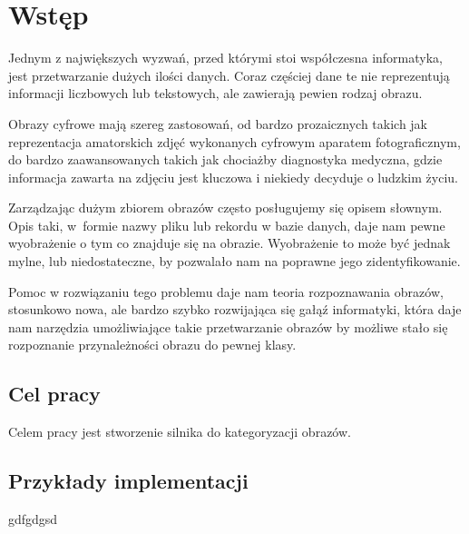 \chapter*{Wstęp}

Jednym z największych wyzwań, przed którymi stoi współczesna informatyka, jest przetwarzanie dużych ilości danych. Coraz częściej dane te nie reprezentują informacji liczbowych lub tekstowych, ale zawierają pewien rodzaj obrazu. 

Obrazy cyfrowe mają szereg zastosowań, od bardzo prozaicznych takich jak reprezentacja amatorskich zdjęć wykonanych cyfrowym aparatem fotograficznym, do bardzo zaawansowanych takich jak chociażby diagnostyka medyczna, gdzie informacja zawarta na zdjęciu jest kluczowa i niekiedy decyduje o ludzkim życiu.

Zarządzając dużym zbiorem obrazów często posługujemy się opisem słownym. Opis taki, w~formie nazwy pliku lub rekordu w bazie danych, daje nam pewne wyobrażenie o tym co znajduje się na obrazie. Wyobrażenie to może być jednak mylne, lub niedostateczne, by pozwalało nam na poprawne jego zidentyfikowanie.

Pomoc w rozwiązaniu tego problemu daje nam teoria rozpoznawania obrazów, stosunkowo nowa, ale bardzo szybko rozwijająca się gałąź informatyki, która daje nam narzędzia umożliwiające takie przetwarzanie obrazów by możliwe stało się rozpoznanie przynależności obrazu do pewnej klasy.

\section*{Cel pracy}
Celem pracy jest stworzenie silnika do kategoryzacji obrazów.

\section*{Przykłady implementacji}
gdfgdgsd